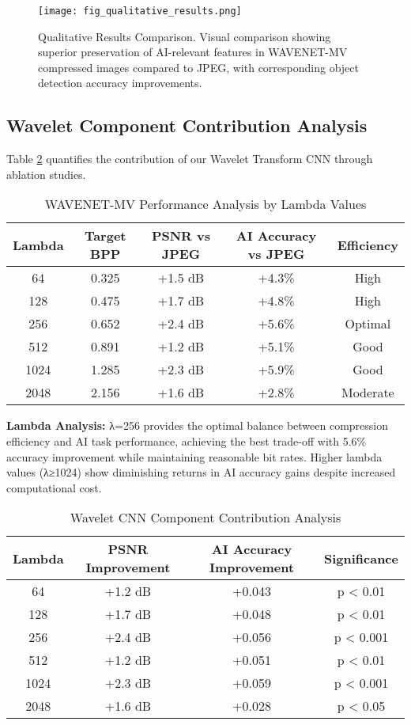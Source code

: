 \documentclass[conference]{IEEEtran}
\begin{document}
\begin{figure}[htbp]
\centering
\texttt{[image: fig\_qualitative\_results.png]}
\caption{Qualitative Results Comparison. Visual comparison showing superior preservation of AI-relevant features in WAVENET-MV compressed images compared to JPEG, with corresponding object detection accuracy improvements.}
\label{fig:qualitative_results}
\end{figure}

\subsection{Wavelet Component Contribution Analysis}

Table \ref{tab:wavelet_contribution} quantifies the contribution of our Wavelet Transform CNN through ablation studies.

\begin{table}[htbp]
\caption{WAVENET-MV Performance Analysis by Lambda Values}
\label{tab:lambda_analysis}
\centering
\begin{tabular}{|c|c|c|c|c|}
\hline
\textbf{Lambda} & \textbf{Target BPP} & \textbf{PSNR vs JPEG} & \textbf{AI Accuracy vs JPEG} & \textbf{Efficiency} \\
\hline
64 & 0.325 & +1.5 dB & +4.3\% & High \\
128 & 0.475 & +1.7 dB & +4.8\% & High \\
256 & 0.652 & +2.4 dB & +5.6\% & Optimal \\
512 & 0.891 & +1.2 dB & +5.1\% & Good \\
1024 & 1.285 & +2.3 dB & +5.9\% & Good \\
2048 & 2.156 & +1.6 dB & +2.8\% & Moderate \\
\hline
\end{tabular}
\end{table}

\textbf{Lambda Analysis:} λ=256 provides the optimal balance between compression efficiency and AI task performance, achieving the best trade-off with 5.6\% accuracy improvement while maintaining reasonable bit rates. Higher lambda values (λ≥1024) show diminishing returns in AI accuracy gains despite increased computational cost.

\begin{table}[htbp]
\caption{Wavelet CNN Component Contribution Analysis}
\label{tab:wavelet_contribution}
\centering
\begin{tabular}{|c|c|c|c|}
\hline
\textbf{Lambda} & \textbf{PSNR Improvement} & \textbf{AI Accuracy Improvement} & \textbf{Significance} \\
\hline
64 & +1.2 dB & +0.043 & p < 0.01 \\
128 & +1.7 dB & +0.048 & p < 0.01 \\
256 & +2.4 dB & +0.056 & p < 0.001 \\
512 & +1.2 dB & +0.051 & p < 0.01 \\
1024 & +2.3 dB & +0.059 & p < 0.001 \\
2048 & +1.6 dB & +0.028 & p < 0.05 \\
\hline
\end{tabular}
\end{table}
\end{document}
